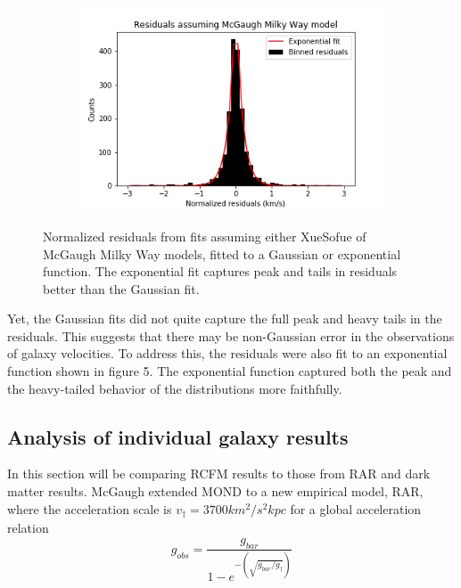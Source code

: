 \documentclass[reprint,%
 amsmath,amssymb,
 aps,
]{revtex4-1}
\begin{document}
\begin{figure}[h]
\begin{subfigure}[b]{0.475\textwidth}
         \label{fig:XueSofue residuals exponential fit}
     \end{subfigure}
     \begin{subfigure}[b]{0.475\textwidth}
         \centering
         \includegraphics[width=.8\linewidth]{figures/ResidualHist_ExpFit_v1_sinh_v2_cosh_McGaugh.png}
         \label{fig:McGaugh residuals exponential fit}
     \end{subfigure}
        \caption{Normalized residuals from fits assuming either XueSofue of McGaugh Milky Way models, fitted to a Gaussian or exponential function. The exponential fit captures peak and tails in residuals better than the Gaussian fit.}
        \label{fig:residual graphs}
\end{figure}
Yet, the Gaussian fits did not quite capture the full peak and heavy tails in the residuals. This suggests that there may be non-Gaussian error in the observations of galaxy velocities. To address this, the residuals were also fit to an exponential function shown in figure 5. The exponential function captured both the peak and the heavy-tailed behavior of the distributions more faithfully.



 \subsection{ Analysis of individual galaxy results}
 \label{results:MtoL}
 
   In this section will be 
   comparing RCFM results to those from RAR and dark matter results. 
   McGaugh extended MOND to a new empirical model, RAR,  where the acceleration scale is  $v_\dagger = 3700 km^2/ s^2 kpc$  for a global acceleration relation
\begin{equation}
    g_{obs}=\frac{g_{bar}}{1-e^{-(\sqrt{g_{bar}/g_\dagger})}}
    \label{Eq:RAR}
\end{equation}
\end{document}
